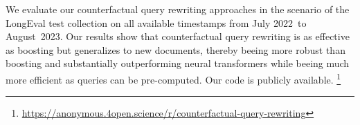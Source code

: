 We evaluate our counterfactual query rewriting approaches in the scenario of the LongEval test collection on all available timestamps from July 2022~to August~2023. Our results show that counterfactual query rewriting is as effective as boosting but generalizes to new documents, thereby beeing more robust than boosting and substantially outperforming neural transformers while beeing much more efficient as queries can be pre-computed. Our code is publicly available.%
\footnote{\url{https://anonymous.4open.science/r/counterfactual-query-rewriting}}


